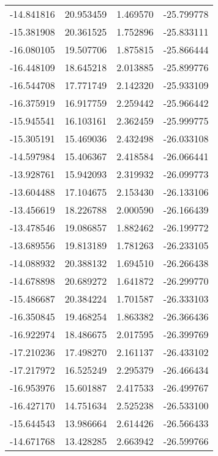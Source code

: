 \begin{tabular}{rrrr}
      -14.841816 &        20.953459 &    1.469570 & -25.799778 \\
      -15.381908 &        20.361525 &    1.752896 & -25.833111 \\
      -16.080105 &        19.507706 &    1.875815 & -25.866444 \\
      -16.448109 &        18.645218 &    2.013885 & -25.899776 \\
      -16.544708 &        17.771749 &    2.142320 & -25.933109 \\
      -16.375919 &        16.917759 &    2.259442 & -25.966442 \\
      -15.945541 &        16.103161 &    2.362459 & -25.999775 \\
      -15.305191 &        15.469036 &    2.432498 & -26.033108 \\
      -14.597984 &        15.406367 &    2.418584 & -26.066441 \\
      -13.928761 &        15.942093 &    2.319932 & -26.099773 \\
      -13.604488 &        17.104675 &    2.153430 & -26.133106 \\
      -13.456619 &        18.226788 &    2.000590 & -26.166439 \\
      -13.478546 &        19.086857 &    1.882462 & -26.199772 \\
      -13.689556 &        19.813189 &    1.781263 & -26.233105 \\
      -14.088932 &        20.388132 &    1.694510 & -26.266438 \\
      -14.678898 &        20.689272 &    1.641872 & -26.299770 \\
      -15.486687 &        20.384224 &    1.701587 & -26.333103 \\
      -16.350845 &        19.468254 &    1.863382 & -26.366436 \\
      -16.922974 &        18.486675 &    2.017595 & -26.399769 \\
      -17.210236 &        17.498270 &    2.161137 & -26.433102 \\
      -17.217972 &        16.525249 &    2.295379 & -26.466434 \\
      -16.953976 &        15.601887 &    2.417533 & -26.499767 \\
      -16.427170 &        14.751634 &    2.525238 & -26.533100 \\
      -15.644543 &        13.986664 &    2.614426 & -26.566433 \\
      -14.671768 &        13.428285 &    2.663942 & -26.599766 \\

\end{tabular}
